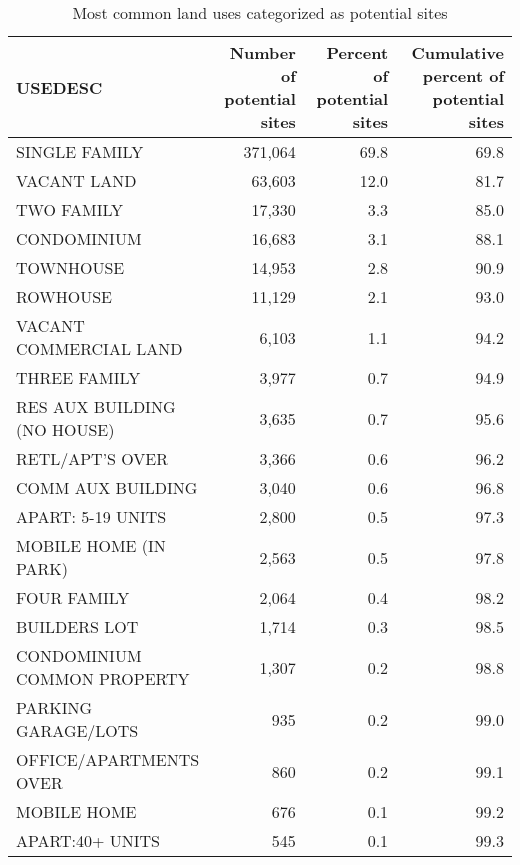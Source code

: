\documentclass[
]{book}
\theoremstyle{definition}
\theoremstyle{definition}
\theoremstyle{definition}
\theoremstyle{definition}
\theoremstyle{remark}
\begin{document}
\begin{table}

\caption{\label{tab:list-site-uses}Most common land uses categorized as potential sites}
\centering
\begin{tabular}[t]{lrrr}
\toprule
USEDESC & Number of potential sites & Percent of potential sites & Cumulative percent of potential sites\\
\midrule
SINGLE FAMILY & 371,064 & 69.8 & 69.8\\
VACANT LAND & 63,603 & 12.0 & 81.7\\
TWO FAMILY & 17,330 & 3.3 & 85.0\\
CONDOMINIUM & 16,683 & 3.1 & 88.1\\
TOWNHOUSE & 14,953 & 2.8 & 90.9\\
\addlinespace
ROWHOUSE & 11,129 & 2.1 & 93.0\\
VACANT COMMERCIAL LAND & 6,103 & 1.1 & 94.2\\
THREE FAMILY & 3,977 & 0.7 & 94.9\\
RES AUX BUILDING (NO HOUSE) & 3,635 & 0.7 & 95.6\\
RETL/APT'S OVER & 3,366 & 0.6 & 96.2\\
\addlinespace
COMM AUX BUILDING & 3,040 & 0.6 & 96.8\\
APART: 5-19 UNITS & 2,800 & 0.5 & 97.3\\
MOBILE HOME (IN PARK) & 2,563 & 0.5 & 97.8\\
FOUR FAMILY & 2,064 & 0.4 & 98.2\\
BUILDERS LOT & 1,714 & 0.3 & 98.5\\
\addlinespace
CONDOMINIUM COMMON PROPERTY & 1,307 & 0.2 & 98.8\\
PARKING GARAGE/LOTS & 935 & 0.2 & 99.0\\
OFFICE/APARTMENTS OVER & 860 & 0.2 & 99.1\\
MOBILE HOME & 676 & 0.1 & 99.2\\
APART:40+ UNITS & 545 & 0.1 & 99.3\\
\bottomrule
\end{tabular}
\end{table}
\end{document}
